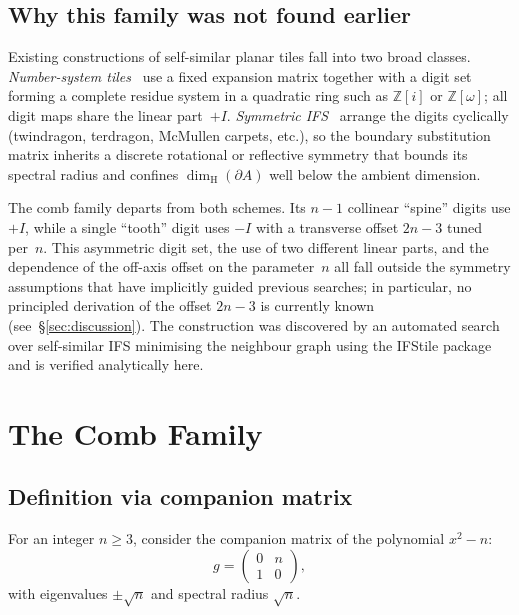 \documentclass{amsart}
\theoremstyle{definition}
\theoremstyle{remark}
\newcommand{\Z}{\mathbb{Z}}
\newcommand{\dH}{\dim_{\mathrm{H}}}
\begin{document}
\subsection*{Why this family was not found earlier}

Existing constructions of self-similar planar tiles fall into two
broad classes.  \emph{Number-system tiles}~\cite{akiyama-thuswaldner,
lagarias-wang} use a fixed expansion matrix together with a digit
set forming a complete residue system in a quadratic ring such as
$\Z[i]$ or $\Z[\omega]$; all digit maps share the linear part~$+I$.
\emph{Symmetric IFS}~\cite{bandt-wang,duvall-keesling-strichartz}
arrange the digits cyclically (twindragon, terdragon, McMullen
carpets, etc.), so the boundary substitution matrix inherits a
discrete rotational or reflective symmetry that bounds its
spectral radius and confines $\dH(\partial A)$ well below the
ambient dimension.

The comb family departs from both schemes.  Its $n{-}1$ collinear
``spine'' digits use $+I$, while a single ``tooth'' digit uses
$-I$ with a transverse offset $2n{-}3$ tuned per~$n$.  This
asymmetric digit set, the use of two different linear parts, and
the dependence of the off-axis offset on the parameter~$n$ all
fall outside the symmetry assumptions that have implicitly
guided previous searches; in particular, no principled
derivation of the offset $2n{-}3$ is currently known
(see~\S\ref{sec:discussion}).  The construction was discovered by
an automated search over self-similar IFS minimising the
neighbour graph using the IFStile package~\cite{ifstile} and is
verified analytically here.

\section{The Comb Family}
\label{sec:comb}

\subsection{Definition via companion matrix}

For an integer $n \ge 3$, consider the companion matrix
of the polynomial $x^2 - n$:
\begin{equation}\label{eq:companion}
  g = \begin{pmatrix} 0 & n \\ 1 & 0 \end{pmatrix},
\end{equation}
with eigenvalues $\pm\sqrt{n}$ and spectral radius $\sqrt{n}$.
\end{document}
